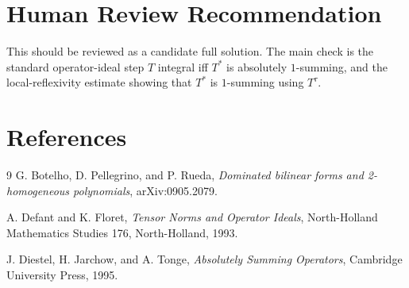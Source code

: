 \documentclass[11pt]{article}
\begin{document}
\section*{Human Review Recommendation}

This should be reviewed as a candidate full solution. The main check is the
standard operator-ideal step \(T\) integral iff \(T^*\) is absolutely
\(1\)-summing, and the local-reflexivity estimate showing that \(T^*\) is
\(1\)-summing using \(T^\tau\).

\section*{References}

\begin{thebibliography}{9}
G. Botelho, D. Pellegrino, and P. Rueda,
\emph{Dominated bilinear forms and 2-homogeneous polynomials},
arXiv:0905.2079.

A. Defant and K. Floret,
\emph{Tensor Norms and Operator Ideals},
North-Holland Mathematics Studies 176, North-Holland, 1993.

J. Diestel, H. Jarchow, and A. Tonge,
\emph{Absolutely Summing Operators},
Cambridge University Press, 1995.
\end{thebibliography}
\end{document}
